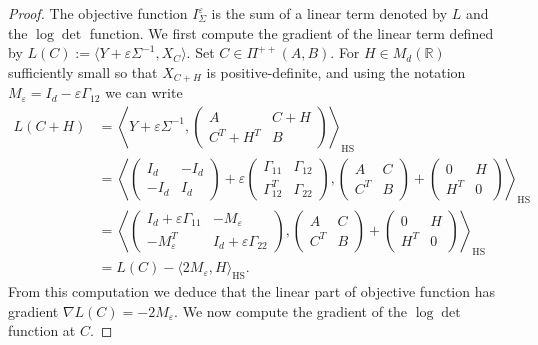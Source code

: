 \documentclass[]{article}
\DeclareMathOperator{\HS}{HS}
\numberwithin{equation}{section}
\theoremstyle{plain}
\begin{document}
\begin{proof}
The objective function $I_\Sigma^\varepsilon$ is the sum of a linear term denoted by $L$ and the $\log\det$ function. We first compute the gradient of the linear term defined by $L(C) := \langle Y + \varepsilon \Sigma^{-1}, X_C \rangle$. Set $C \in \Pi^{++}(A,B)$. For $H  \in M_d(\mathbb{R})$ sufficiently small so that $X_{C+H}$ is positive-definite, and using the notation $M_\varepsilon = I_d - \varepsilon \Gamma_{12}$ we can write
    \begin{align*}
        L(C+H) &=  \left\langle Y + \varepsilon \Sigma^{-1}, \begin{pmatrix}
        A & C + H \\
        C^T+ H^T& B
    \end{pmatrix}\right \rangle_{\HS}  \\
    & = \left\langle  \begin{pmatrix}
    	I_d & -I_d \\
    	-I_d & I_d
    \end{pmatrix} + \varepsilon  \begin{pmatrix}
    \Gamma_{11} & \Gamma_{12} \\
    \Gamma_{12}^T& \Gamma_{22}
\end{pmatrix}, \begin{pmatrix}
        A & C \\
        C^T& B
    \end{pmatrix} + \begin{pmatrix}
        0 &  H \\
         H^T& 0
    \end{pmatrix}\right \rangle_{\HS}  \\
	    & = \left\langle  \begin{pmatrix}
		I_d + \varepsilon \Gamma_{11} & -M_\varepsilon \\
		-M_\varepsilon^T& I_d + \varepsilon \Gamma_{22}
	\end{pmatrix}, \begin{pmatrix}
		A & C \\
		C^T& B
	\end{pmatrix} + \begin{pmatrix}
		0 &  H \\
		H^T& 0
	\end{pmatrix}\right \rangle _{\HS}  \\
    & = L(C) -\langle  2 M_{\varepsilon}, H \rangle_{\HS} .
    \end{align*}
From this computation we deduce that the linear part of objective function has gradient ${\nabla L(C) = -2M_\varepsilon}$. We now compute the gradient of the $\log\det$ function at $C$. 

\end{proof}
\end{document}
